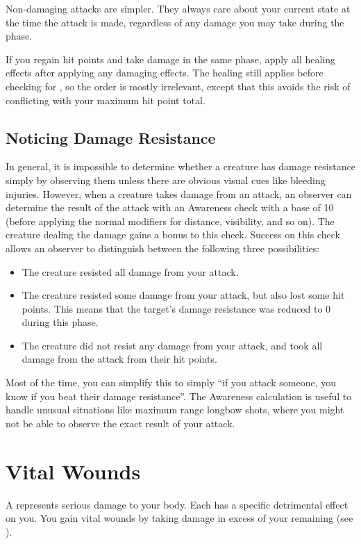         Non-damaging attacks are simpler.
        They always care about your current state at the time the attack is made, regardless of any damage you may take during the phase.

        \label{Simultaneous Damage and Healing}
        If you regain hit points and take damage in the same phase, apply all healing effects after applying any damaging effects.
        The healing still applies before checking for , so the order is mostly irrelevant, except that this avoids the risk of conflicting with your maximum hit point total.

    \subsection{Noticing Damage Resistance}
        In general, it is impossible to determine whether a creature has damage resistance simply by observing them unless there are obvious visual cues like bleeding injuries.
        However, when a creature takes damage from an attack, an observer can determine the result of the attack with an Awareness check with a base  of 10 (before applying the normal modifiers for distance, visibility, and so on).
        The creature dealing the damage gains a  bonus to this check.
        Success on this check allows an observer to distinguish between the following three possibilities:
        \begin{itemize}
            \item The creature resisted all damage from your attack.
            \item The creature resisted some damage from your attack, but also lost some hit points.
                This means that the target's damage resistance was reduced to 0 during this phase.
            \item The creature did not resist any damage from your attack, and took all damage from the attack from their hit points.
        \end{itemize}
        Most of the time, you can simplify this to simply ``if you attack someone, you know if you beat their damage resistance''.
        The Awareness calculation is useful to handle unusual situations like maximum range longbow shots, where you might not be able to observe the exact result of your attack.

\section{Vital Wounds}\label{Vital Wounds}
    A  represents serious damage to your body.
    Each  has a specific detrimental effect on you.
    You gain vital wounds by taking damage in excess of your remaining  (see ).

